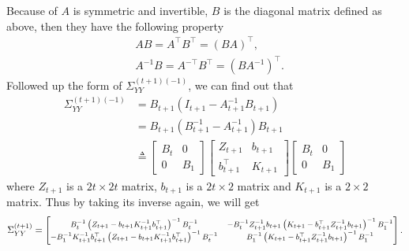 Because of $A$ is symmetric and invertible, $B$ is the diagonal matrix defined as above, then they have the following property 
\begin{align*}
& AB=A^\top B^\top = \left(BA\right)^\top, \\
& A^{-1}B = A^{-\top}B^\top = \left(BA^{-1}\right)^\top. 
\end{align*}
Followed up the form of $\Sigma_{YY}^{\left(t+1\right) \left(-1\right)}$, we can find out that 
\begin{align*}
\Sigma_{YY}^{\left(t+1\right) \left(-1\right)} &= B_{t+1}\left(I_{t+1}-A_{t+1}^{-1}B_{t+1}\right) \\
&= B_{t+1}\left(B_{t+1}^{-1}-A_{t+1}^{-1}\right)B_{t+1} \\
&\triangleq \begin{bmatrix} 
B_t & 0 \\ 0 & B_1 \end{bmatrix}
\begin{bmatrix} 
Z_{t+1} & b_{t+1} \\
b_{t+1}^\top & K_{t+1}
\end{bmatrix} \begin{bmatrix} 
B_t & 0 \\ 0 & B_1\end{bmatrix}
\end{align*}
where $Z_{t+1}$ is a $2t \times 2t$ matrix, $ b_{t+1} $ is a $2t \times 2$ matrix and $K_{t+1}$ is a $2 \times 2$ matrix. Thus by taking its inverse again, we will get 
\begin{align*} \footnotesize \Sigma_{YY}^{\left(t+1\right)}= \begin{bmatrix}
B_t^{-1} \left(Z_{t+1}-b_{t+1}K_{t+1}^{-1}b_{t+1}^\top\right)^{-1}B_t^{-1}  & - B_t^{-1}  Z_{t+1}^{-1}b_{t+1}\left(K_{t+1}-b_{t+1}^\top Z_{t+1}^{-1}b_{t+1}\right)^{-1}B_1^{-1} \\
-B_1^{-1}  K_{t+1}^{-1}b_{t+1}^\top \left(Z_{t+1}-b_{t+1}K_{t+1}^{-1}b_{t+1}^\top\right)^{-1}B_t^{-1}  & B_1^{-1}  \left(K_{t+1}-b_{t+1}^\top Z_{t+1}^{-1}b_{t+1}\right)^{-1}B_1^{-1} 
\end{bmatrix}.
\end{align*}

